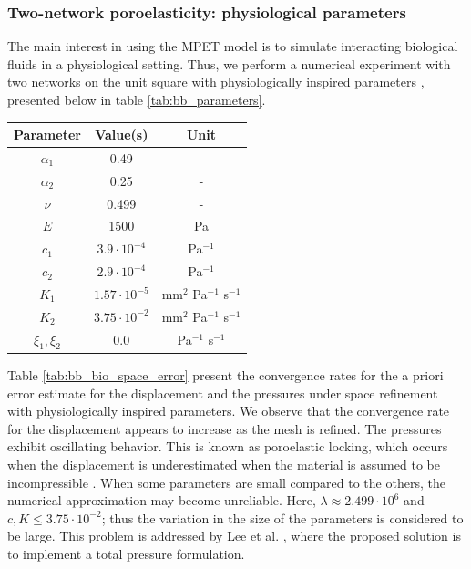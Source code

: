 \subsubsection{Two-network poroelasticity: physiological parameters} \label{section:num_mpet2_bio}
The main interest in using the MPET model is to simulate interacting biological fluids in a physiological setting. Thus, we perform a numerical experiment with two networks on the unit square with physiologically inspired parameters \cite{lee2018}, presented below in table \ref{tab:bb_parameters}. 
\begin{center}
\begin{tabular}{c|c|c}
Parameter & Value(s) & Unit \\\hline
$\alpha_1$  & 0.49 & -\\
$\alpha_2$  & 0.25 & -\\
$\nu$ & 0.499 & -\\
$E$ & 1500 & Pa\\
$c_1$ & $3.9 \cdot 10^{-4}$ & Pa$^{-1}$ \\
$c_2$ & $2.9 \cdot 10^{-4}$ & Pa$^{-1}$ \\
$K_1$ & $1.57 \cdot 10^{-5}$ & mm$^2$ Pa$^{-1}$ s$^{-1}$ \\
$K_2$ & $3.75 \cdot 10^{-2}$ & mm$^2$ Pa$^{-1}$ s$^{-1}$ \\
$\xi_{1}, \xi_{2}$ & 0.0 & Pa$^{-1}$ s$^{-1}$ \\
\end{tabular}
 \label{tab:bb_parameters}
\end{center}
Table \ref{tab:bb_bio_space_error} present the convergence rates for the a priori error estimate for the displacement and the pressures under space refinement with physiologically inspired parameters. We observe that the convergence rate for the displacement appears to increase as the mesh is refined. The pressures exhibit oscillating behavior. This is known as poroelastic locking, which occurs when the displacement is underestimated when the material is assumed to be incompressible \cite{phillips}. When some parameters are small compared to the others, the numerical approximation may become unreliable. Here, $\lambda \approx 2.499 \cdot 10^6$ and $c, K \leq 3.75 \cdot 10^{-2}$; thus the variation in the size of the parameters is considered to be large. This problem is addressed by Lee et al. \cite{lee2018}, where the proposed solution is to implement a total pressure formulation.  
